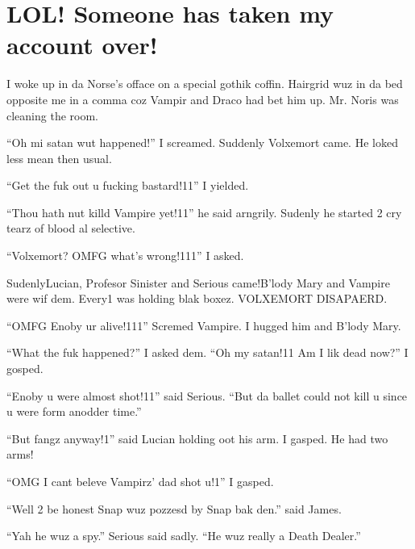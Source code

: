 \section{LOL\@! Someone has taken my account over!}




I woke up in da Norse's offace on a special gothik coffin. Hairgrid wuz in da bed opposite me in a comma coz Vampir and Draco had bet him up. Mr. Noris was cleaning the room.

\enquote{Oh mi satan wut happened!} I screamed. Suddenly Volxemort came. He loked less mean then usual.

\enquote{Get the fuk out u fucking bastard!11} I yielded.

\enquote{Thou hath nut killd Vampire yet!11} he said arngrily. Sudenly he started 2 cry tearz of blood al selective.

\enquote{Volxemort? OMFG what's wrong!111} I asked.

Sudenly\dotfill Lucian, Profesor Sinister and Serious came!\newline B'lody Mary and Vampire were wif dem. Every1 was holding blak boxez. VOLXEMORT DISAPAERD.

\enquote{OMFG Enoby ur alive!111} Scremed Vampire. I hugged him and B'lody Mary.

\enquote{What the fuk happened?} I asked dem. \enquote{Oh my satan!11 Am I lik dead now?} I gosped.

\enquote{Enoby u were almost shot!11} said Serious. \enquote{But da ballet could not kill u since u were form anodder time.}

\enquote{But fangz anyway!1} said Lucian holding oot his arm. I gasped. He had two arms!

\enquote{OMG I cant beleve Vampirz' dad shot u!1} I gasped.

\enquote{Well 2 be honest Snap wuz pozzesd by Snap bak den.} said James.

\enquote{Yah he wuz a spy.} Serious said sadly. \enquote{He wuz really a Death Dealer.}

